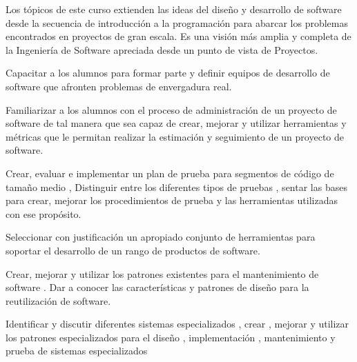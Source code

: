 \begin{syllabus}


\begin{justification}
Los tópicos de este curso extienden las ideas del diseño y desarrollo de software desde la secuencia de introducción a la programación para
abarcar los problemas encontrados en proyectos de gran escala. Es una visión más amplia y completa de la Ingeniería
de Software apreciada desde un punto de vista de Proyectos.
\end{justification}

\begin{goals}
\item Capacitar a los alumnos para formar parte y definir equipos de desarrollo de software que afronten problemas de envergadura real.
\item Familiarizar a los alumnos con el proceso de administración de un proyecto de software de tal manera que sea capaz de crear, mejorar y utilizar herramientas y métricas que le permitan realizar la estimación y seguimiento de un proyecto de software.
\item Crear, evaluar e implementar un plan de prueba para segmentos de código de tamaño medio  , Distinguir entre los diferentes tipos de pruebas ,  sentar las bases para  crear, mejorar los procedimientos de prueba y las herramientas utilizadas con ese propósito.
\item Seleccionar con justificación un apropiado conjunto de herramientas para soportar el desarrollo de un rango de productos de software.
\item Crear, mejorar y utilizar  los patrones existentes para el mantenimiento de software . Dar a conocer las características y patrones de diseño para la reutilización de software.
\item Identificar y discutir diferentes sistemas especializados , crear , mejorar y utilizar los patrones especializados para el diseño , implementación , mantenimiento y prueba   de sistemas especializados
\end{goals}

\begin{outcomes}
    \item {}
    \item {}
    \item {}
    \item {}
    \item {}
\end{outcomes}


\end{syllabus}
